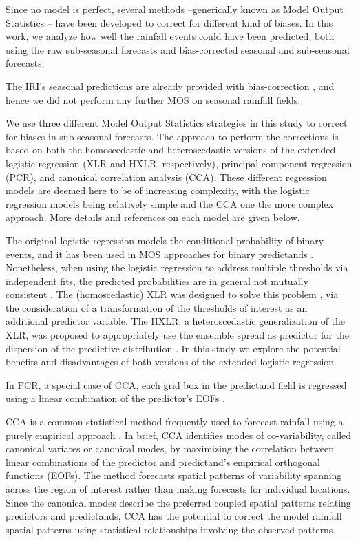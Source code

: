 \documentclass[twocol]{ametsoc}
\begin{document}
Since no model is perfect, several methods --generically known as Model Output Statistics \citep[MOS;][]{Glahn:1972vt} -- have been developed to correct for different kind of biases.
In this work, we analyze how well the rainfall events could have been predicted, both using the raw sub-seasonal forecasts and bias-corrected seasonal and sub-seasonal forecasts.

The IRI's seasonal predictions are already provided with bias-correction \citep{Barnston:2010ge}, and hence we did not perform any further MOS on seasonal rainfall fields.

We use three different Model Output Statistics strategies in this study to correct for biases in sub-seasonal forecasts.
The approach to perform the corrections is based on both the homoscedastic and heteroscedastic versions of the extended logistic regression (XLR and HXLR, respectively), principal component regression (PCR), and canonical correlation analysis (CCA).
These different regression models are deemed here to be of increasing complexity, with the logistic regression models being relatively simple and the CCA one the more complex approach. More details and references on each model are given below.

The original logistic regression models the conditional probability of binary events, and it has been used in MOS approaches for binary predictands \citep{Hamill:2004hk}.
Nonetheless, when using the logistic regression to address multiple thresholds via independent fits, the predicted probabilities are in general not mutually consistent \citep{Messner:2014gp}.
The (homoscedastic) XLR was designed to solve this problem \citep{Wilks:2009bk}, via the consideration of a transformation of the thresholds of interest as an additional predictor variable.
The HXLR, a heteroscedastic generalization of the XLR, was proposed to appropriately use the ensemble spread as predictor for the dispersion of the predictive distribution \citep{Messner:2014gp}.
In this study we explore the potential benefits and disadvantages of both versions of the extended logistic regression.

In PCR, a special case of CCA, each grid box in the predictand field is regressed using a linear combination of the predictor's EOFs \citep{Mason:2008da,Wilks:2006fx}.

CCA is a common statistical method frequently used to forecast rainfall using a purely empirical approach \citep{Mason:2008da,Barnston:2012ce}.
In brief, CCA \citep{Barnston:1992gd,Wilks:2006fx} identifies modes of co-variability, called canonical variates or canonical modes, by maximizing the correlation between linear combinations of the predictor and predictand's empirical orthogonal functions (EOFs).
The method forecasts spatial patterns of variability spanning across the region of interest rather than making forecasts for individual locations.
Since the canonical modes describe the preferred coupled spatial patterns relating predictors and predictands, CCA has the potential to correct the model rainfall spatial patterns using statistical relationships involving the observed patterns.
\end{document}
